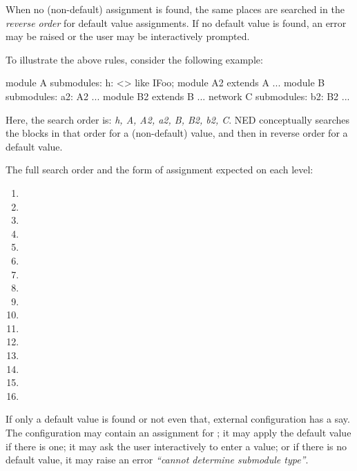 {When no (non-default) assignment is found, the same places are searched in the
\textit{reverse order} for default value assignments. If no default value is
found, an error may be raised or the user may be interactively prompted.

To illustrate the above rules, consider the following example:

\begin{ned}
module A { submodules: h: <> like IFoo; }
module A2 extends A {...}
module B { submodules: a2: A2 {...} }
module B2 extends B {...}
network C { submodules: b2: B2 {...} }
\end{ned}

Here, the search order is: \textit{h, A, A2, a2, B, B2, b2, C}. NED
conceptually searches the  blocks in that order for a
(non-default) value, and then in reverse order for a default value.

The full search order and the form of assignment expected on each level:

\begin{enumerate}
  \item {}
  \item {}
  \item {}
  \item {}
  \item {}
  \item {}
  \item {}
  \item {}
  \item {}
  \item {}
  \item {}
  \item {}
  \item {}
  \item {}
  \item {}
  \item {}
\end{enumerate}

If only a default value is found or not even that, external configuration
has a say. The configuration may contain an assignment for
; it may apply the default value if there is one;
it may ask the user interactively to enter a value; or if there is no
default value, it may raise an error \textit{``cannot determine submodule
type''}.


}
